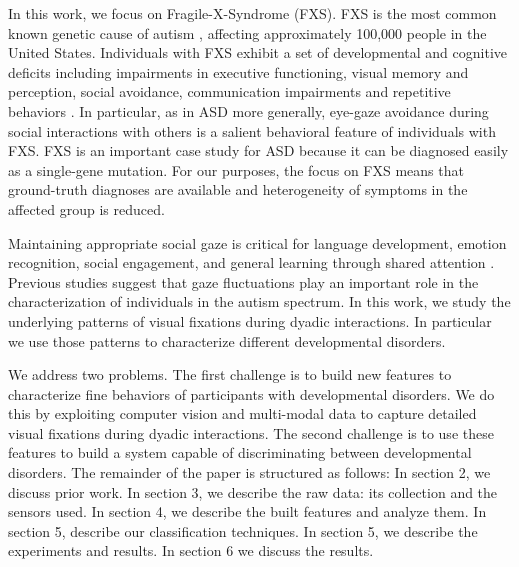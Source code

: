 \documentclass{llncs}
\begin{document}
  In this work, we focus on Fragile-X-Syndrome (FXS). FXS is the most common known genetic cause of autism \cite{Hagerman:2008wg}, affecting approximately 100,000 people in the United States. Individuals with FXS exhibit a set of developmental and cognitive deficits including impairments in executive functioning, visual memory and perception, social avoidance, communication impairments and repetitive behaviors \cite{Sullivan:2007gz}. In particular, as in ASD more generally, eye-gaze avoidance during social interactions with others is a salient behavioral feature of individuals with FXS. FXS is an important case study for ASD because it can be diagnosed easily as a single-gene mutation. For our purposes, the focus on FXS means that ground-truth diagnoses are available and heterogeneity of symptoms in the affected group is reduced.

  Maintaining appropriate social gaze is critical for language development, emotion recognition, social engagement, and general learning through shared attention \cite{Csibra:2006wf}. Previous studies \cite{klin2002} suggest that gaze fluctuations play an important role in the characterization of individuals in the autism spectrum. In this work, we study the underlying patterns of visual fixations during dyadic interactions. In particular we use those patterns to characterize different developmental disorders.

  We address two problems. The first challenge is to build new features to characterize fine behaviors of participants with developmental disorders. We do this by exploiting computer vision and multi-modal data to capture detailed visual fixations during dyadic interactions. The second challenge is to use these features to build a system capable of discriminating between developmental disorders. The remainder of the paper is structured as follows: In section 2, we discuss prior work. In section 3, we describe the raw data: its collection and the sensors used. In section 4, we describe the built features and analyze them. In section 5, describe our classification techniques. In section 5, we describe the experiments and results. In section 6 we discuss the results.
\end{document}
